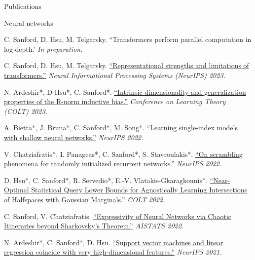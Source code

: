 \documentclass{resume} %
\begin{document}
\newpage
\begin{rSection}{Publications}
\begin{rSubsection}{Neural networks}{}{}{}{}

\item C. Sanford, D. Hsu, M. Telgarsky. {``Transformers perform parallel computation in log-depth.'} \textit{In preparation.}

\item C. Sanford, D. Hsu, M. Telgarsky. \href{https://arxiv.org/abs/2306.02896}{``Representational strengths and limitations of transformers.''} \textit{Neural Informational Processing Systems (NeurIPS) 2023.}

\item N. Ardeshir*, D Hsu*, C. Sanford*. \href{https://proceedings.mlr.press/v195/ardeshir23a.html}{``Intrinsic dimensionality and generalization properties of the R-norm inductive bias.''} \textit{Conference on Learning Theory (COLT) 2023.}

\item A. Bietta*, J. Bruna*, C. Sanford*, M. Song*. \href{https://proceedings.neurips.cc/paper_files/paper/2022/hash/3fb6c52aeb11e09053c16eabee74dd7b-Abstract-Conference.html}{``Learning single-index models with shallow neural networks.''} \textit{NeurIPS 2022.}

\item V. Chatziafratis*, I. Panageas*, C. Sanford*, S. Stavroulakis*. \href{https://proceedings.neurips.cc/paper_files/paper/2022/hash/755acd0c7c07180d78959b6d89768207-Abstract-Conference.html}{``On scrambling phenomena for randomly initialized recurrent networks.''} \textit{NeurIPS 2022.}

\item D. Hsu*, C. Sanford*, R. Servedio*, E.-V. Vlatakis-Gkaragkounis*. \href{https://proceedings.mlr.press/v178/hsu22a.html}{``Near-Optimal Statistical Query Lower Bounds for Agnostically Learning Intersections of Halfspaces with Gaussian Marginals.''} \textit{COLT 2022.}

\item C. Sanford, V. Chatziafratis. \href{https://proceedings.mlr.press/v151/sanford22a.html}{``Expressivity of Neural Networks via Chaotic Itineraries beyond Sharkovsky's Theorem.''} \textit{AISTATS 2022.}

\item N. Ardeshir*, C. Sanford*, D. Hsu. \href{https://proceedings.neurips.cc/paper/2021/hash/26d4b4313a7e5828856bc0791fca39a2-Abstract.html}{``Support vector machines and linear regression coincide with very high-dimensional features.''} \textit{NeurIPS 2021.}


\end{rSubsection}
\end{rSection}
\end{document}
